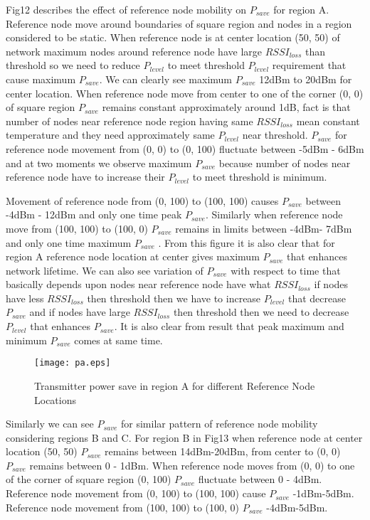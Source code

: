 \documentclass[12pt, conference, compsocconf, onecolumn, draftcls]{IEEEtran}
\begin{document}
Fig12 describes the effect of reference node mobility on $P_{save}$ for region A.   Reference node move around boundaries of  square region and nodes in a region  considered to be static. When reference node is at center location (50, 50) of network maximum nodes around reference node have large $RSSI_{loss}$ than threshold so we need to reduce $P_{level}$ to meet threshold $P_{level}$ requirement that cause maximum $P_{save}$.  We can clearly see maximum $P_{save}$ 12dBm to 20dBm for center location.  When reference  node move  from center to one of  the corner (0, 0) of square region $P_{save}$ remains constant approximately around 1dB, fact is that number of nodes near reference node region having same $RSSI_{loss}$ mean constant temperature and they need approximately same $P_{level}$ near threshold. $P_{save}$ for reference node movement from (0, 0) to (0, 100) fluctuate between -5dBm - 6dBm and at two moments we observe maximum $P_{save}$ because number of nodes near reference node have to increase their $P_{level}$ to meet threshold is minimum.

Movement of reference node from (0, 100) to (100, 100) causes $P_{save}$ between -4dBm - 12dBm and only one time peak $P_{save}$. Similarly when reference node move from (100, 100) to (100, 0) $P_{save}$ remains in limits between -4dBm- 7dBm and only one time maximum $P_{save}$ . From this figure it is also clear that for region A reference node location at center gives maximum $P_{save}$ that enhances network lifetime. We can also see variation of $P_{save}$ with respect to time that basically depends upon nodes near reference node have what $RSSI_{loss}$ if nodes have less $RSSI_{loss}$ then threshold then we have to increase $P_{level}$ that decrease $P_{save}$ and if nodes have large $RSSI_{loss}$ then threshold then we need to decrease $P_{level}$ that enhances $P_{save}$. It is also clear from result that peak maximum and minimum $P_{save}$ comes at same time.

\begin{figure}[h]
\begin{center}
\texttt{[image: pa.eps]}
\caption{ Transmitter power save in region A for different Reference Node Locations}
\end{center}
\end{figure}

Similarly we can see $P_{save}$ for similar pattern of reference node mobility considering regions B and C. For region B in Fig13 when reference node at center location (50, 50) $P_{save}$  remains between 14dBm-20dBm, from center to (0, 0) $P_{save}$ remains between 0 - 1dBm. When reference node moves from (0, 0) to one of the corner of square region (0, 100) $P_{save}$  fluctuate between 0 - 4dBm. Reference node movement from (0, 100) to (100, 100)  cause $P_{save}$ -1dBm-5dBm. Reference node movement from (100, 100) to (100, 0) $P_{save}$ -4dBm-5dBm.
\end{document}
